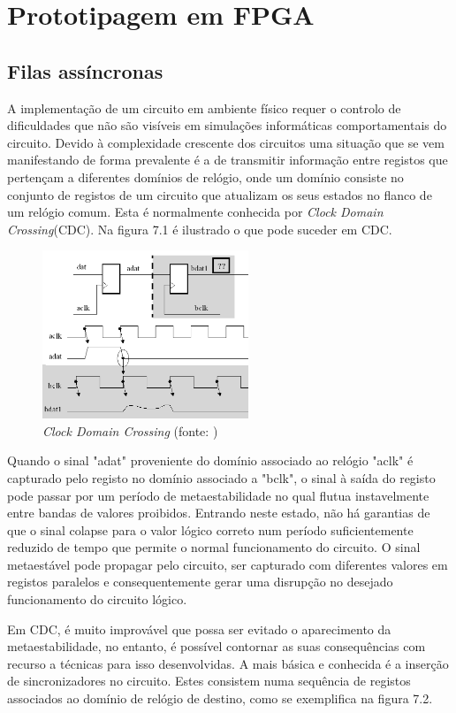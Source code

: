 \chapter{Prototipagem em FPGA}

\section{Filas assíncronas}

A implementação de um circuito em ambiente físico requer o controlo de dificuldades que não são visíveis em simulações informáticas comportamentais do circuito. Devido à complexidade crescente dos circuitos uma situação que se vem manifestando de forma prevalente é a de transmitir informação entre registos que pertençam a diferentes domínios de relógio, onde um domínio consiste no conjunto de registos de um circuito que atualizam os seus estados no flanco de um relógio comum. Esta é normalmente conhecida por \textit{Clock Domain Crossing}(CDC). Na figura 7.1 é ilustrado o que pode suceder em CDC.  

\begin{figure}[H]
  \centering
  \includegraphics[width=0.55\textwidth]{CDC.png}
  \caption[\textit{Clock Domain Crossing} ]{\textit{Clock Domain Crossing} (fonte: \cite{CDC})}
  \label{fig:airbus1}
\end{figure}

Quando o sinal "adat" proveniente do domínio associado ao relógio "aclk" é capturado pelo registo no domínio associado a "bclk", o sinal à saída do registo pode passar por um período de metaestabilidade no qual flutua instavelmente entre bandas de valores proibidos. Entrando neste estado, não há garantias de que o sinal colapse para o valor lógico correto num período suficientemente reduzido de tempo que permite o normal funcionamento do circuito. O sinal metaestável pode propagar pelo circuito, ser capturado com diferentes valores em registos paralelos e consequentemente gerar uma disrupção no desejado funcionamento do circuito lógico. \par 
Em CDC, é muito improvável que possa ser evitado o aparecimento da metaestabilidade, no entanto, é possível contornar as suas consequências com recurso a técnicas para isso desenvolvidas. A mais básica e conhecida é a inserção de sincronizadores no circuito. Estes consistem numa sequência de registos associados ao domínio de relógio de destino, como se exemplifica na figura 7.2.

